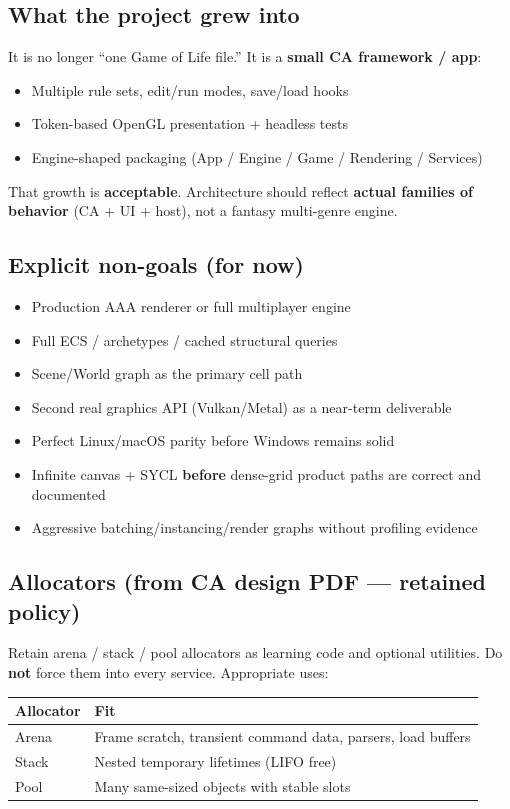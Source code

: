 \documentclass[10pt,a4paper]{article}
\begin{document}
\subsection{What the project grew into}
It is no longer ``one Game of Life file.'' It is a \textbf{small CA framework / app}:
\begin{itemize}
    \item Multiple rule sets, edit/run modes, save/load hooks
    \item Token-based OpenGL presentation + headless tests
    \item Engine-shaped packaging (App / Engine / Game / Rendering / Services)
\end{itemize}
That growth is \textbf{acceptable}. Architecture should reflect \textbf{actual families of behavior} (CA + UI + host), not a fantasy multi-genre engine.

\subsection{Explicit non-goals (for now)}
\begin{itemize}
    \item Production AAA renderer or full multiplayer engine
    \item Full ECS / archetypes / cached structural queries
    \item Scene/World graph as the primary cell path
    \item Second real graphics API (Vulkan/Metal) as a near-term deliverable
    \item Perfect Linux/macOS parity before Windows remains solid
    \item Infinite canvas + SYCL \textbf{before} dense-grid product paths are correct and documented
    \item Aggressive batching/instancing/render graphs without profiling evidence
\end{itemize}

\subsection{Allocators (from CA design PDF --- retained policy)}
Retain arena / stack / pool allocators as learning code and optional utilities. Do \textbf{not} force them into every service. Appropriate uses:

\begin{table}[h!]
\centering
\small
\begin{tabularx}{\textwidth}{l X}
\toprule
\textbf{Allocator} & \textbf{Fit} \\
\midrule
Arena & Frame scratch, transient command data, parsers, load buffers \\
Stack & Nested temporary lifetimes (LIFO free) \\
Pool & Many same-sized objects with stable slots \\
\bottomrule
\end{tabularx}
\end{table}
\end{document}
